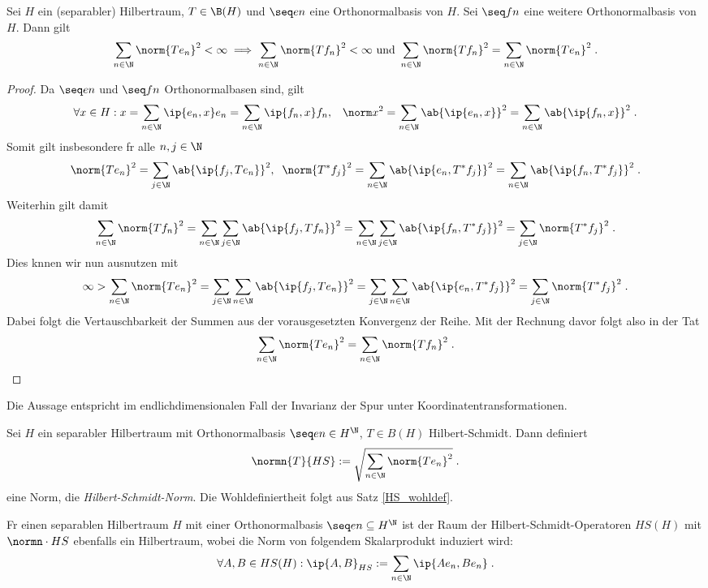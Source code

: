 \begin{theorem}
	Sei $H$ ein (separabler) Hilbertraum, \(T\in \B(H)\) und \(\seq en\) eine Orthonormalbasis von $H$. Sei \(\seq fn\) eine weitere Orthonormalbasis von $H$. Dann gilt
	\[\sum_{n\in\N} \norm{Te_n}^2 < \infty\implies \sum_{n\in \N} \norm{T f_n}^2 < \infty \text{ und } \sum_{n\in\N}\norm{Tf_n}^2 = \sum_{n\in\N}\norm{T e_n}^2\;.\]
	\label{HS_wohldef}
\end{theorem}
\begin{proof}
	Da \(\seq en\) und \(\seq fn\) Orthonormalbasen sind, gilt 
	\[\forall x \in H: x = \sum_{n\in\N}  \ip{e_n,x} e_n  = \sum_{n\in\N}  \ip{f_n,x} f_n ,\;\; \;\norm x^2 =  \sum_{n\in\N}\ab{\ip{e_n, x}}^2   =  \sum_{n\in\N}\ab{\ip{f_n, x}}^2 \;.\]
	Somit gilt insbesondere f\us r alle \(n, j \in \N\)
	\[\norm{Te_n}^2 = \sum_{j\in \N} \ab{\ip{f_j, Te_n}}^2,\;\; \norm{T^*f_j}^2 = \sum_{n\in \N} \ab{\ip{e_n, T^* f_j}}^2 =  \sum_{n\in \N} \ab{\ip{f_n, T^* f_j}}^2 \;.\]
	Weiterhin gilt damit
	\[\sum_{n\in\N} \norm{Tf_n}^2 = \sum_{n\in\N}\sum_{j\in\N} \ab{\ip{f_j, Tf_n}}^2 = \sum_{n\in\N}\sum_{j\in\N} \ab{\ip{f_n, T^*f_j}}^2 = \sum_{j\in\N} \norm{T^*f_j}^2\;.\]
	Dies k\os nnen wir nun ausnutzen mit 
	\[\infty > \sum_{n\in\N} \norm{T e_n}^2 = \sum_{j\in\N}\sum_{n\in\N} \ab{\ip{f_j, Te_n}}^2 = \sum_{j\in\N}\sum_{n\in\N} \ab{\ip{e_n, T^*f_j}}^2 = \sum_{j\in\N} \norm{T^* f_j}^2\;.\]
	Dabei folgt die Vertauschbarkeit der Summen aus der vorausgesetzten Konvergenz der Reihe. Mit der Rechnung davor folgt also in der Tat 
	\[\sum_{n\in\N} \norm{T e_n}^2  = \sum_{n\in\N} \norm{T f_n}^2 \;.\]
\end{proof}
\begin{rem}
	Die Aussage entspricht im endlichdimensionalen Fall der Invarianz der Spur unter Koordinatentransformationen.
\end{rem}

\begin{definition}
	Sei \(H\) ein separabler Hilbertraum mit Orthonormalbasis \(\seq en \in H^\N\), \(T\in B(H)\) Hilbert-Schmidt. Dann definiert 
	\[\normn{T}{HS} := \sqrt{\sum_{n\in\N}\norm{Te_n}^2}\;.\]
	eine Norm, die \textit{Hilbert-Schmidt-Norm}. Die Wohldefiniertheit folgt aus Satz \ref{HS_wohldef}.
\end{definition}
 \begin{rem}
 	F\us r einen separablen Hilbertraum $H$ mit einer Orthonormalbasis \(\seq en \subseteq H^\N\) ist der Raum der Hilbert-Schmidt-Operatoren \(HS(H)\) mit \(\normn\cdot{HS}\) ebenfalls ein Hilbertraum, wobei die Norm von folgendem Skalarprodukt induziert wird:
 	\[\forall A,B \in HS(H): \ip{A,B}_{HS}:= \sum_{n\in \N}\ip{Ae_n, Be_n}\;.\]
 \end{rem}


